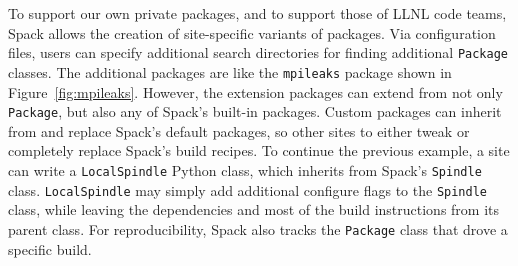 To support our own private packages, and to support those of LLNL code teams,
Spack allows the creation of site-specific variants of packages.
Via configuration files, users can specify additional search
directories for finding additional {\tt Package} classes.
%
The additional packages are like the {\tt mpileaks} package shown in Figure~\ref{fig:mpileaks}.  However, the extension packages can extend from not
only {\tt Package}, but also any of Spack's built-in packages.
Custom packages can inherit from and replace Spack's default
packages, so other sites to either tweak or completely replace Spack's
build recipes.  To continue the previous example, a site can write
a {\tt LocalSpindle} Python class, which inherits from Spack's
{\tt Spindle} class.  {\tt LocalSpindle} may simply add additional
configure flags to the {\tt Spindle} class, while leaving the
dependencies and most of the build instructions from its parent
class.  For reproducibility, Spack also tracks the {\tt Package}
class that drove a specific build.
